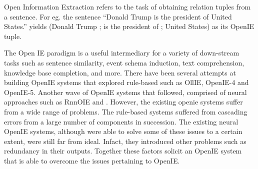 




\begin{comment}

  Skelaton

What is OpenIE - 1 line
list a few systems
problems with recent systems
new benchmark was needed
so we made carb, how is carb different
problems with openie models
imojie, mention perf improvements
errors made by imojie, add error analysis
mention mlil paper

\end{comment}

Open Information Extraction refers to the task of obtaining relation tuples from a sentence. For eg. the sentence ``Donald Trump is the president of United States.'' yields (Donald Trump ; is the president of ; United States) as its OpenIE tuple.

The Open IE paradigm is a useful intermediary for a variety of down-stream tasks such as sentence similarity, event schema induction, text comprehension, knowledge base completion, and more. There have been several attempts at building OpenIE systems that explored rule-based such as OllIE, OpenIE-4 and OpenIE-5. Another wave of OpenIE systems that followed, comprised of neural approaches such as RnnOIE and \citet{cui&al18}. However, the existing openie systems suffer from a wide range of problems. The rule-based systems suffered from cascading errors from a large number of components in succession. The existing neural OpenIE systems, although were able to solve some of these issues to a certain extent, were still far from ideal. Infact, they introduced other problems such as redundancy in their outputs. Together these factors solicit an OpenIE system that is able to overcome the issues pertaining to OpenIE.

